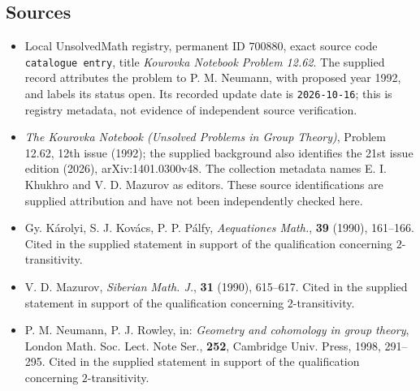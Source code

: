 \documentclass[11pt]{article}
\begin{document}
\subsection{Sources}
\begin{itemize}
\item Local UnsolvedMath registry, permanent ID \(700880\), exact source code \texttt{catalogue entry}, title \emph{Kourovka Notebook Problem 12.62}. The supplied record attributes the problem to P. M. Neumann, with proposed year 1992, and labels its status open. Its recorded update date is \texttt{2026-10-16}; this is registry metadata, not evidence of independent source verification.
\item \emph{The Kourovka Notebook (Unsolved Problems in Group Theory)}, Problem 12.62, 12th issue (1992); the supplied background also identifies the 21st issue edition (2026), arXiv:1401.0300v48. The collection metadata names E. I. Khukhro and V. D. Mazurov as editors. These source identifications are supplied attribution and have not been independently checked here.
\item Gy. K\'arolyi, S. J. Kov\'acs, P. P. P\'alfy, \emph{Aequationes Math.}, \textbf{39} (1990), 161--166. Cited in the supplied statement in support of the qualification concerning \(2\)-transitivity.
\item V. D. Mazurov, \emph{Siberian Math. J.}, \textbf{31} (1990), 615--617. Cited in the supplied statement in support of the qualification concerning \(2\)-transitivity.
\item P. M. Neumann, P. J. Rowley, in: \emph{Geometry and cohomology in group theory}, London Math. Soc. Lect. Note Ser., \textbf{252}, Cambridge Univ. Press, 1998, 291--295. Cited in the supplied statement in support of the qualification concerning \(2\)-transitivity.
\end{itemize}
\end{document}
